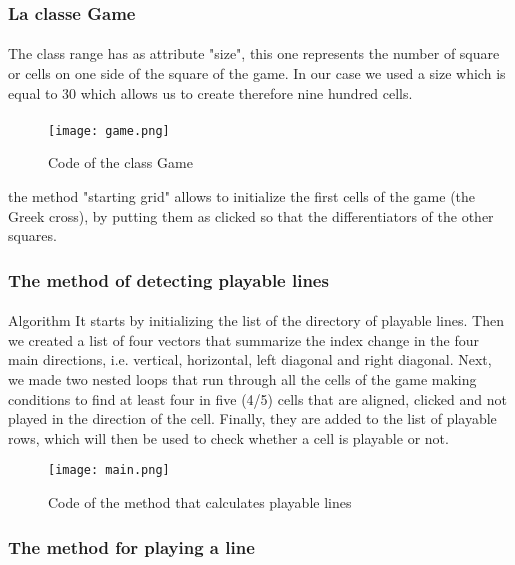 \documentclass{article}
\begin{document}
\subsubsection{La classe Game}
\paragraph{}
\setlength{\parindent}{2cm}
  The class range has as attribute "size", this one represents the number of square or cells on one side of the square of the game. In our case we used a size which is equal to 30 which allows us to create therefore nine hundred cells.
 \paragraph{}
\setlength{\parindent}{2cm}
\begin{figure}[!h]
\centering
\texttt{[image: game.png]}
\\%
\caption{Code of the class Game}
\end{figure}
the method "starting grid" allows to initialize the first cells of the game (the Greek cross), by putting them as clicked so that the differentiators of the other squares.
\subsubsection{The method of detecting playable lines}
\paragraph{}
\setlength{\parindent}{2cm}
Algorithm It starts by initializing the list of the directory of playable lines. Then we created a list of four vectors that summarize the index change in the four main directions, i.e. vertical, horizontal, left diagonal and right diagonal. Next, we made two nested loops that run through all the cells of the game making conditions to find at least four in five (4/5) cells that are aligned, clicked and not played in the direction of the cell. Finally, they are added to the list of playable rows, which will then be used to check whether a cell is playable or not.  
 \begin{figure}[!h]
\centering
\texttt{[image: main.png]}
\\%
\caption{Code of the method that calculates playable lines}
\end{figure}
\subsubsection{The method for playing a line}
\end{document}

